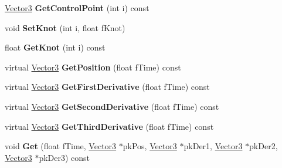 \begin{DoxyCompactItemize}
\item 
\hyperlink{class_magnum_1_1_vector3}{Vector3} {\bfseries Get\+Control\+Point} (int i) const \hypertarget{class_magnum_1_1_b_spline_curve3_a72f3c8f27a19eed12453411bdaff6a8d}{}\label{class_magnum_1_1_b_spline_curve3_a72f3c8f27a19eed12453411bdaff6a8d}

\item 
void {\bfseries Set\+Knot} (int i, float f\+Knot)\hypertarget{class_magnum_1_1_b_spline_curve3_a38fc4ff2b84fae6913e522fd1453a01e}{}\label{class_magnum_1_1_b_spline_curve3_a38fc4ff2b84fae6913e522fd1453a01e}

\item 
float {\bfseries Get\+Knot} (int i) const \hypertarget{class_magnum_1_1_b_spline_curve3_a76b7f346148f53eb8b938cb17f841d0b}{}\label{class_magnum_1_1_b_spline_curve3_a76b7f346148f53eb8b938cb17f841d0b}

\item 
virtual \hyperlink{class_magnum_1_1_vector3}{Vector3} {\bfseries Get\+Position} (float f\+Time) const \hypertarget{class_magnum_1_1_b_spline_curve3_a6ed4bc006965cf2d19a67f253204a433}{}\label{class_magnum_1_1_b_spline_curve3_a6ed4bc006965cf2d19a67f253204a433}

\item 
virtual \hyperlink{class_magnum_1_1_vector3}{Vector3} {\bfseries Get\+First\+Derivative} (float f\+Time) const \hypertarget{class_magnum_1_1_b_spline_curve3_ad5ce6745d6e250acb9ab9ef3428cb10e}{}\label{class_magnum_1_1_b_spline_curve3_ad5ce6745d6e250acb9ab9ef3428cb10e}

\item 
virtual \hyperlink{class_magnum_1_1_vector3}{Vector3} {\bfseries Get\+Second\+Derivative} (float f\+Time) const \hypertarget{class_magnum_1_1_b_spline_curve3_aa1c536dea8a718d6efe35b4630bc2f21}{}\label{class_magnum_1_1_b_spline_curve3_aa1c536dea8a718d6efe35b4630bc2f21}

\item 
virtual \hyperlink{class_magnum_1_1_vector3}{Vector3} {\bfseries Get\+Third\+Derivative} (float f\+Time) const \hypertarget{class_magnum_1_1_b_spline_curve3_a095a73b55905863776863aa44f9cdec6}{}\label{class_magnum_1_1_b_spline_curve3_a095a73b55905863776863aa44f9cdec6}

\item 
void {\bfseries Get} (float f\+Time, \hyperlink{class_magnum_1_1_vector3}{Vector3} $\ast$pk\+Pos, \hyperlink{class_magnum_1_1_vector3}{Vector3} $\ast$pk\+Der1, \hyperlink{class_magnum_1_1_vector3}{Vector3} $\ast$pk\+Der2, \hyperlink{class_magnum_1_1_vector3}{Vector3} $\ast$pk\+Der3) const \hypertarget{class_magnum_1_1_b_spline_curve3_ab808f592fe8a686d98cf26653ef1295d}{}\label{class_magnum_1_1_b_spline_curve3_ab808f592fe8a686d98cf26653ef1295d}


\end{DoxyCompactItemize}
